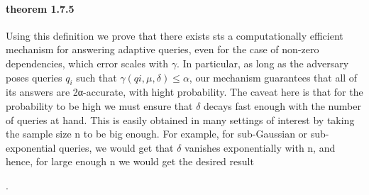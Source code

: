 \documentclass{article}
\begin{document}
\paragraph{theorem 1.7.5}
Using this definition we prove that there exists sts a computationally efficient mechanism for answering adaptive queries, 
even for the case of non-zero dependencies, which error scales with $\gamma$.
In particular, as long as the adversary poses queries $q_i$ such that $\gamma(qi,μ,δ) ≤ α$, 
our mechanism guarantees that all of its answers are 2α-accurate, with hight probability.
The caveat here is that for the probability to be high we must ensure that $\delta$ decays fast enough with the number of queries at hand.
This is easily obtained in many settings of interest by taking the sample size n to be big enough. 
For example, for sub-Gaussian or sub-exponential queries, we would get that $\delta$ vanishes exponentially with n, 
and hence, for large enough n we would get the desired result

.
\end{document}
